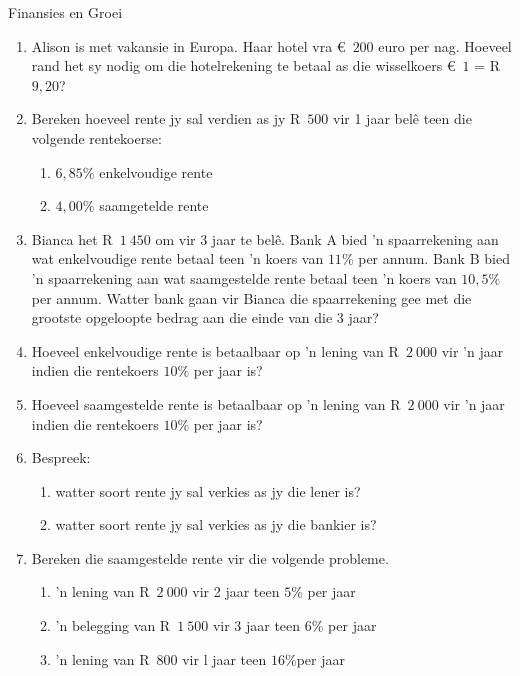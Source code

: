 \begin{eocexercises}{Finansies en Groei}
    \begin{enumerate}[label=\textbf{\arabic*}.]
	\item Alison is met vakansie in Europa. Haar hotel vra €~$200$ euro per nag. Hoeveel rand het sy nodig om die hotelrekening te betaal as die wisselkoers  €~$1$ = R~$9,20$?

	\item Bereken hoeveel rente jy sal verdien as jy R~$500$ vir 1 jaar belê teen die volgende rentekoerse:
	\begin{enumerate}[label=\textbf{(\alph*)}]
	    \item $6,85\%$ enkelvoudige rente
	    \item $4,00\%$ saamgetelde rente
	\end{enumerate}

	\item Bianca het R~$1~450$ om vir 3 jaar te belê. Bank A bied ’n spaarrekening aan wat enkelvoudige rente betaal
teen ’n koers van $11\%$ per annum. Bank B bied ’n spaarrekening aan wat saamgestelde rente betaal
teen ’n koers van $10,5\%$ per annum. Watter bank gaan vir Bianca die spaarrekening gee met die grootste
opgeloopte bedrag aan die einde van die 3 jaar?

	\item Hoeveel enkelvoudige rente is betaalbaar op ’n lening van R~$2~000$ vir ’n jaar indien die rentekoers $10\%$ per jaar is?

	\item Hoeveel saamgestelde rente is betaalbaar op ’n lening van  R~$2~000$ vir ’n jaar indien die rentekoers $10\%$ per jaar is?

	\item Bespreek:
	\begin{enumerate}[label=\textbf{(\alph*)}]
	    \item watter soort rente jy sal verkies as jy die lener is?

	    \item watter soort rente jy sal verkies as jy die bankier is?
	\end{enumerate}

	\item Bereken die saamgestelde rente vir die volgende probleme.
	\begin{enumerate}[label=\textbf{(\alph*)}]
	    \item ’n lening van R~$2~000$ vir 2 jaar teen  $5\%$ per jaar
	    \item ’n belegging van  R~$1~500$ vir 3 jaar teen $6\%$ per jaar
	    \item ’n lening van R~$800$ vir l jaar teen $16\%$per jaar
	\end{enumerate}


\end{enumerate}
\end{eocexercises}
